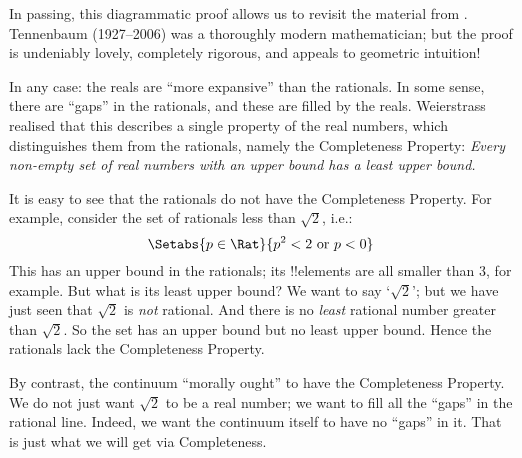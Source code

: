 \documentclass[../../../include/open-logic-section]{subfiles}
\begin{document}
In passing, this diagrammatic proof allows us to revisit the material from . Tennenbaum (1927--2006) was a thoroughly modern mathematician; but the proof is undeniably lovely, completely rigorous, and appeals to geometric intuition!

In any case: the reals are ``more expansive'' than the rationals. In some sense, there are ``gaps'' in the rationals, and these are filled by the reals. Weierstrass realised that this describes a single property of the real numbers, which distinguishes them from the rationals, namely the Completeness Property: \emph{Every non-empty set of real numbers with an upper bound has a least upper bound.} 

It is easy to see that the rationals do not have the Completeness Property. For example, consider the set of rationals less than $\sqrt{2}$, i.e.:
\[
	\Setabs{p \in \Rat}{p^2 < 2 \text{ or }p < 0}
\]
This has an upper bound in the rationals; its !!{elements} are all  smaller than $3$, for example. But what is its least upper bound? We want to say `$\sqrt{2}$'; but we have just seen that $\sqrt{2}$ is \emph{not} rational. And there is no \emph{least} rational number greater than $\sqrt{2}$. So the set has an upper bound but no least upper bound. Hence the rationals lack the Completeness Property.

By contrast, the continuum ``morally ought'' to have the Completeness Property. We do not just want $\sqrt{2}$ to be a real number; we want to fill all the ``gaps'' in the rational line. Indeed, we want the continuum itself to have no ``gaps'' in it. That is just what we will get via Completeness.
\end{document}

